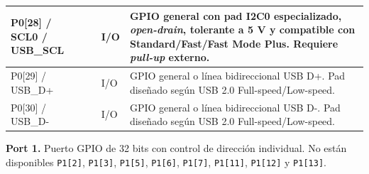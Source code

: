 ﻿\documentclass[11pt]{article}
\begin{document}
\begin{longtable}{|>{\raggedright\arraybackslash}p{}|>{\raggedright\arraybackslash}p{}|>{\raggedright\arraybackslash}p{}|>{\raggedright\arraybackslash}p{}|}
\hline
P0[28] / SCL0 / USB\_SCL & 24 & I/O & GPIO general con pad I2C0 especializado, \textit{open-drain}, tolerante a 5 V y compatible con Standard/Fast/Fast Mode Plus. Requiere \textit{pull-up} externo. \\
\hline
P0[29] / USB\_D+ & 29 & I/O & GPIO general o línea bidireccional USB D+. Pad diseñado según USB 2.0 Full-speed/Low-speed. \\
\hline
P0[30] / USB\_D- & 30 & I/O & GPIO general o línea bidireccional USB D-. Pad diseñado según USB 2.0 Full-speed/Low-speed. \\
\hline
\end{longtable}

\noindent\textbf{Port 1.} Puerto GPIO de 32 bits con control de dirección individual. No están disponibles \texttt{P1[2]}, \texttt{P1[3]}, \texttt{P1[5]}, \texttt{P1[6]}, \texttt{P1[7]}, \texttt{P1[11]}, \texttt{P1[12]} y \texttt{P1[13]}.
\end{document}
